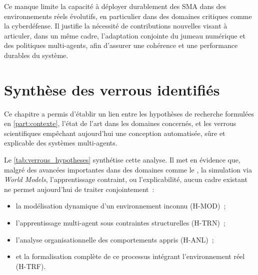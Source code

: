 Ce manque limite la capacité à déployer durablement des SMA dans des environnements réels évolutifs, en particulier dans des domaines critiques comme la cyberdéfense. Il justifie la nécessité de contributions nouvelles visant à articuler, dans un même cadre, l’adaptation conjointe du jumeau numérique et des politiques multi-agents, afin d’assurer une cohérence et une performance durables du système.






\section*{Synthèse des verrous identifiés}

\noindent
Ce chapitre a permis d'établir un lien entre les hypothèses de recherche formulées en \autoref{part:contexte}, l'état de l'art dans les domaines concernés, et les verrous scientifiques empêchant aujourd'hui une conception automatisée, sûre et explicable des systèmes multi-agents.

\medskip

\noindent
Le \autoref{tab:verrous_hypotheses} synthétise cette analyse. Il met en évidence que, malgré des avancées importantes dans des domaines comme le , la simulation via \textit{World Models}, l'apprentissage contraint, ou l'explicabilité, aucun cadre existant ne permet aujourd'hui de traiter conjointement~:
\begin{itemize}
  \item la modélisation dynamique d'un environnement inconnu (H-MOD)~;
  \item l'apprentissage multi-agent sous contraintes structurelles (H-TRN)~;
  \item l'analyse organisationnelle des comportements appris (H-ANL)~;
  \item et la formalisation complète de ce processus intégrant l'environnement réel (H-TRF).
\end{itemize}

